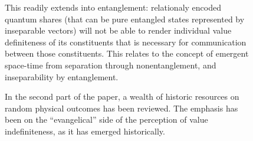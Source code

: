 \documentclass[entropy,article,accept,oneauthor,pdftex]{Definitions/mdpi}
\begin{document}
\begin{figure}[H]
This readily extends into entanglement: relationaly encoded quantum shares (that can be pure entangled states
represented by inseparable vectors) will not be able to render
individual value definiteness of its constituents that is necessary for communication between those constituents.
This relates to the concept of emergent space-time from
separation through nonentanglement, and inseparability by entanglement.

In the second part of the paper, a wealth of historic resources on random physical outcomes has been reviewed.
The emphasis has been on the ``evangelical'' side of the perception of value indefiniteness,
as it has emerged historically.

\vspace{6pt}






\end{figure}
\end{document}
